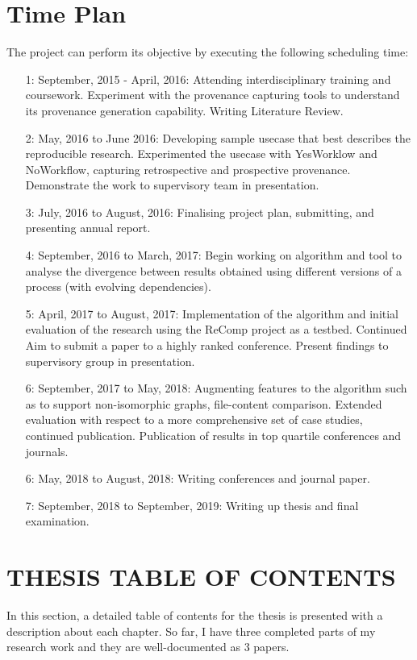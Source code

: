 \documentclass[10pt,conference,twocolumn]{IEEEtran}
\begin{document}
\section{Time Plan}
The project can perform its objective by executing the following scheduling time:
\begin{enumerate} \label{data}
\item[1:] September, 2015 - April, 2016: Attending interdisciplinary training and coursework. Experiment with the provenance capturing tools to understand its provenance generation capability. Writing Literature Review.
\item[2:] May, 2016 to June 2016: Developing sample usecase that best describes the reproducible research. Experimented the usecase with YesWorklow and NoWorkflow, capturing retrospective and prospective provenance. Demonstrate the work to supervisory team in presentation.
\item[3:] July, 2016 to August, 2016: Finalising project plan, submitting, and presenting annual report.
\item[4:] September, 2016 to March, 2017: Begin working on algorithm and tool to analyse the divergence between results obtained using different versions of a process (with evolving dependencies).
\item[5:] April, 2017 to August, 2017: Implementation of the algorithm and initial evaluation of the research using the ReComp project as a testbed. Continued Aim to submit a paper to a highly ranked conference. Present findings to supervisory group in presentation.
\item[6:] September, 2017 to May, 2018: Augmenting features to the algorithm such as to support non-isomorphic graphs, file-content comparison. Extended evaluation with respect to a more comprehensive set of case studies, continued publication. Publication of results in top quartile conferences and journals. 
\item[6:] May, 2018 to August, 2018: Writing conferences and journal paper.
\item[7:] September, 2018 to September, 2019:
Writing up thesis and final examination.
\end{enumerate}

\section{THESIS TABLE OF CONTENTS}
In this section, a detailed table of contents for the thesis
is presented with a description about each chapter. So far, I
have three completed parts of my research work and they are
well-documented as 3 papers.
\end{document}
